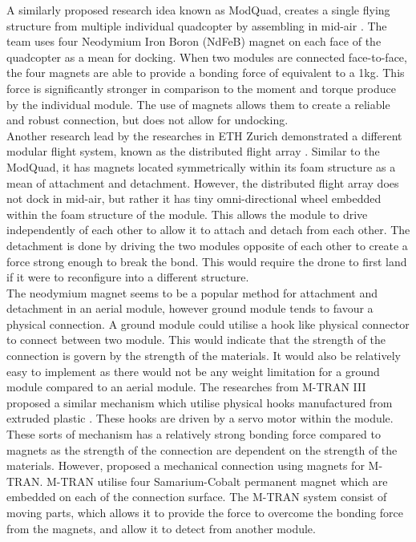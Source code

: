 \documentclass[12pt,A4]{article}
\begin{document}
	A similarly proposed research idea known as ModQuad, creates a single flying structure from multiple individual quadcopter by assembling in mid-air \citep{saldana2018modquad}. The team uses four Neodymium Iron Boron (NdFeB) magnet on each face of the quadcopter as a mean for docking. When two modules are connected face-to-face, the four magnets are able to provide a bonding force of equivalent to a 1kg. This force is significantly stronger in comparison to the moment and torque produce by the individual module. The use of magnets allows them to create a reliable and robust connection, but does not allow for undocking.\\
	
	Another research lead by the researches in ETH Zurich demonstrated a different modular flight system, known as the distributed flight array \citep{oung2011distributed}. Similar to the ModQuad, it has magnets located symmetrically within its foam structure as a mean of attachment and detachment. However, the distributed flight array does not dock in mid-air, but rather it has tiny omni-directional wheel embedded within the foam structure of the module. This allows the module to drive independently of each other to allow it to attach and detach from each other. The detachment is done by driving the two modules opposite of each other to create a force strong enough to break the bond. This would require the drone to first land if it were to reconfigure into a different structure.\\
	
	The neodymium magnet seems to be a popular method for attachment and detachment in an aerial module, however ground module tends to favour a physical connection. A ground module could utilise a hook like physical connector to connect between two module. This would indicate that the strength of the connection is govern by the strength of the materials. It would also be relatively easy to implement as there would not be any weight limitation for a ground module compared to an aerial module. The researches from M-TRAN III proposed a similar mechanism which utilise physical hooks manufactured from extruded plastic \citep{kurokawa2008distributed}. These hooks are driven by a servo motor within the module. These sorts of mechanism has a relatively strong bonding force compared to magnets as the strength of the connection are dependent on the strength of the materials. However, \citep{murata2002m-tran} proposed a mechanical connection using magnets for M-TRAN. M-TRAN utilise four Samarium-Cobalt permanent magnet which are embedded on each of the connection surface. The M-TRAN system consist of moving parts, which allows it to provide the force to overcome the bonding force from the magnets, and allow it to detect from another module.\\
	
\end{document}
